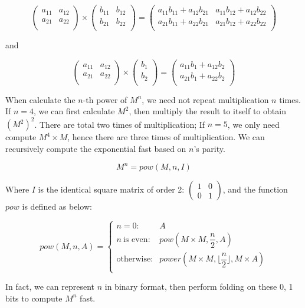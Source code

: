 \documentclass[UTF8]{article}
\begin{document}
\begin{enumerate}
\[
\begin{pmatrix}
a_{11} & a_{12} \\
a_{21} & a_{22} \\
\end{pmatrix}
\times
\begin{pmatrix}
b_{11} & b_{12} \\
b_{21} & b_{22} \\
\end{pmatrix}
=
\begin{pmatrix}
a_{11} b_{11} + a_{12} b_{21} & a_{11} b_{12} + a_{12} b_{22} \\
a_{21} b_{11} + a_{22} b_{21} & a_{21} b_{12} + a_{22} b_{22} \\
\end{pmatrix}
\]

and

\[
\begin{pmatrix}
a_{11} & a_{12} \\
a_{21} & a_{22} \\
\end{pmatrix}
\times
\begin{pmatrix}
b_{1} \\
b_{2} \\
\end{pmatrix}
=
\begin{pmatrix}
a_{11} b_{1} + a_{12} b_{2} \\
a_{21} b_{1} + a_{22} b_{2} \\
\end{pmatrix}
\]

When calculate the $n$-th power of $M^n$, we need not repeat multiplication $n$ times. If $n = 4$, we can first calculate $M^2$, then multiply the result to itself to obtain $(M^2)^2$. There are total two times of multiplication; If $n = 5$, we only need compute $M^4 \times M$, hence there are three times of multiplication. We can recursively compute the exponential fast based on $n$'s parity.

\[
M^n = pow(M, n, I)
\]

Where $I$ is the identical square matrix of order 2: $\displaystyle \begin{pmatrix} 1 & 0 \\ 0 & 1\end{pmatrix}$, and the function $pow$ is defined as below:

\[
pow(M, n, A) = \begin{cases}
n = 0: & A \\
n\ \text{is even}: & pow(M \times M, \dfrac{n}{2}, A) \\
\text{otherwise}: & power(M \times M, \lfloor \dfrac{n}{2} \rfloor, M \times A)\\
\end{cases}
\]

In fact, we can represent $n$ in binary format, then perform folding on these 0, 1 bits to compute $M^n$ fast.

\end{enumerate}
\end{document}
